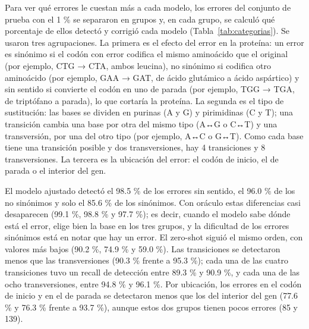 \documentclass[sigconf,nonacm]{acmart}
\begin{document}
Para ver qué errores le cuestan más a cada modelo, los errores del conjunto de prueba con el 1 \% se separaron en grupos y, en cada grupo, se calculó qué porcentaje de ellos detectó y corrigió cada modelo (Tabla~\ref{tab:categorias}). Se usaron tres agrupaciones. La primera es el efecto del error en la proteína: un error es sinónimo si el codón con error codifica el mismo aminoácido que el original (por ejemplo, CTG → CTA, ambos leucina), no sinónimo si codifica otro aminoácido (por ejemplo, GAA → GAT, de ácido glutámico a ácido aspártico) y sin sentido si convierte el codón en uno de parada (por ejemplo, TGG → TGA, de triptófano a parada), lo que cortaría la proteína. La segunda es el tipo de sustitución: las bases se dividen en purinas (A y G) y pirimidinas (C y T); una transición cambia una base por otra del mismo tipo (A↔G o C↔T) y una transversión, por una del otro tipo (por ejemplo, A↔C o G↔T). Como cada base tiene una transición posible y dos transversiones, hay 4 transiciones y 8 transversiones. La tercera es la ubicación del error: el codón de inicio, el de parada o el interior del gen.

El modelo ajustado detectó el 98.5 \% de los errores sin sentido, el 96.0 \% de los no sinónimos y solo el 85.6 \% de los sinónimos. Con oráculo estas diferencias casi desaparecen (99.1 \%, 98.8 \% y 97.7 \%); es decir, cuando el modelo sabe dónde está el error, elige bien la base en los tres grupos, y la dificultad de los errores sinónimos está en notar que hay un error. El zero-shot siguió el mismo orden, con valores más bajos (90.2 \%, 74.9 \% y 59.0 \%). Las transiciones se detectaron menos que las transversiones (90.3 \% frente a 95.3 \%); cada una de las cuatro transiciones tuvo un recall de detección entre 89.3 \% y 90.9 \%, y cada una de las ocho transversiones, entre 94.8 \% y 96.1 \%. Por ubicación, los errores en el codón de inicio y en el de parada se detectaron menos que los del interior del gen (77.6 \% y 76.3 \% frente a 93.7 \%), aunque estos dos grupos tienen pocos errores (85 y 139).
\end{document}
